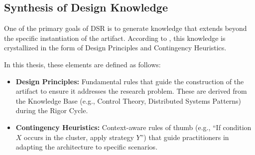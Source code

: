 \subsection{Synthesis of Design Knowledge}
\label{subsec:design-knowledge}

One of the primary goals of DSR is to generate knowledge that extends beyond the specific instantiation of the artifact. According to , this knowledge is crystallized in the form of Design Principles and Contingency Heuristics.

In this thesis, these elements are defined as follows:

\begin{itemize}
    \item \textbf{Design Principles:} Fundamental rules that guide the construction of the artifact to ensure it addresses the research problem. These are derived from the Knowledge Base (e.g., Control Theory, Distributed Systems Patterns) during the Rigor Cycle.
    \item \textbf{Contingency Heuristics:} Context-aware rules of thumb (e.g., ``If condition $X$ occurs in the cluster, apply strategy $Y$'') that guide practitioners in adapting the architecture to specific scenarios.
\end{itemize}